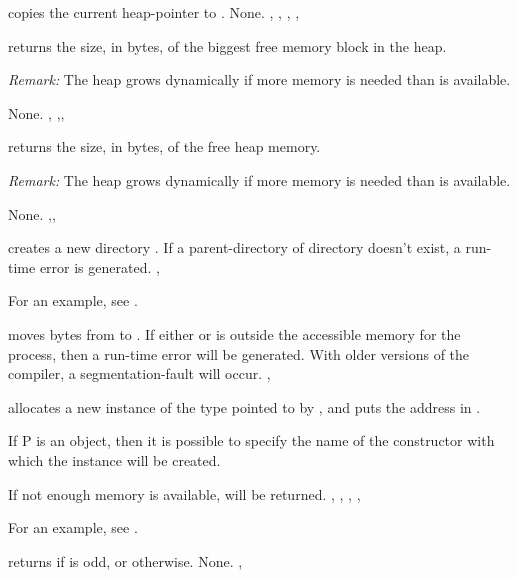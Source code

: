 \documentclass{report}
\begin{document}


{ copies the current heap-pointer to .}
{None.}
{, , , , }



{ returns the size, in bytes, of the biggest free memory block in
the heap.

{\em Remark:} The heap grows dynamically if more memory is needed than is
available.}
{None.}
{, ,, }



{ returns the size, in bytes, of the free heap memory.

{\em Remark:} The heap grows dynamically if more memory is needed than is
available.}
{None.}
{,, }



{ creates a new  directory .}
{If a parent-directory of directory  doesn't exist, a run-time error is generated.}
{, }

For an example, see .

{ moves  bytes from  to .}
{If either  or  is outside the accessible memory for
the process, then a run-time error will be generated. With older versions of
the compiler, a segmentation-fault will occur. }
{, }




{ allocates a new instance of the type pointed to by , and
puts the address in . 

If P is an object, then it is possible to
specify the name of the constructor with which the instance will be created.}
{If not enough memory is available,  will be returned.}
{, , , ,
}

For an example, see .

{ returns  if  is odd, or  otherwise.}
{None.}
{, }
\end{document}

